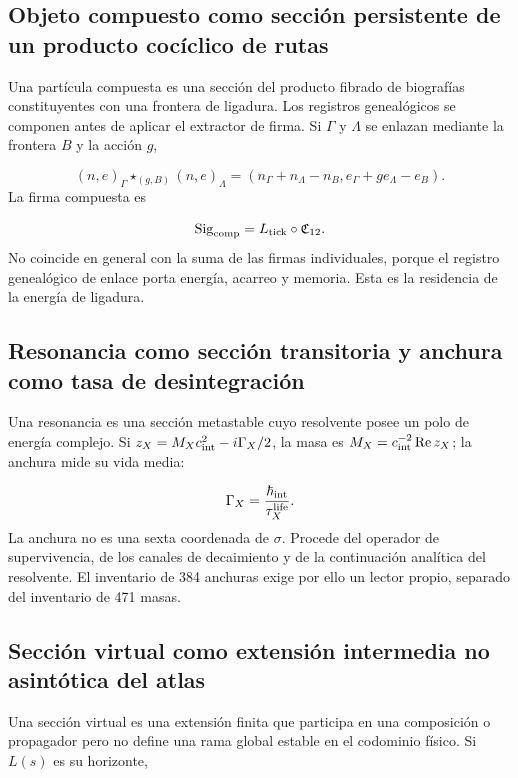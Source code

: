 
\subsection{Objeto compuesto como sección persistente de un producto cocíclico de rutas}
Una partícula compuesta es una sección del producto fibrado de biografías constituyentes con una frontera de ligadura. Los registros genealógicos se componen antes de aplicar el extractor de firma. Si \(\Gamma\) y \(\Lambda\) se enlazan mediante la frontera \(B\) y la acción \(g\),

\[
(n,e)_\Gamma\star_{(g,B)}(n,e)_\Lambda
=
(n_\Gamma+n_\Lambda-n_B,
e_\Gamma+ge_\Lambda-e_B).
\]
La firma compuesta es

\[
\operatorname{Sig}_{\rm comp}
=L_{\rm tick}\circ\mathfrak C_{12}.
\]
No coincide en general con la suma de las firmas individuales, porque el registro genealógico de enlace porta energía, acarreo y memoria. Esta es la residencia de la energía de ligadura.

\subsection{Resonancia como sección transitoria y anchura como tasa de desintegración}
Una resonancia es una sección metastable cuyo resolvente posee un polo de energía complejo. Si \(z_X=M_Xc_{\rm int}^{2}-i\Gamma_X/2\), la masa es \(M_X=c_{\rm int}^{-2}\operatorname{Re}z_X\); la anchura mide su vida media:

\[
\Gamma_X=\frac{\hbar_{\rm int}}{\tau_X^{\rm life}}.
\]
La anchura no es una sexta coordenada de \(\sigma\). Procede del operador de supervivencia, de los canales de decaimiento y de la continuación analítica del resolvente. El inventario de 384 anchuras exige por ello un lector propio, separado del inventario de 471 masas.

\subsection{Sección virtual como extensión intermedia no asintótica del atlas}
Una sección virtual es una extensión finita que participa en una composición o propagador pero no define una rama global estable en el codominio físico. Si \(L(s)\) es su horizonte,

